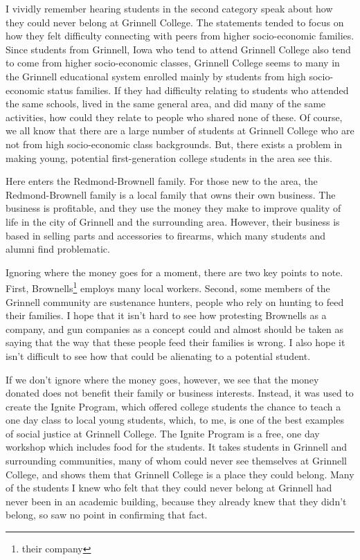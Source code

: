 \documentclass[12pt]{article}[titlepage]
\newcommand{\1}{\={a}}
\newcommand{\2}{\={e}}
\newcommand{\3}{\={\i}}
\newcommand{\4}{\=o}
\newcommand{\5}{\=u}
\newcommand{\6}{\={A}}
\renewcommand{\,}{\textsuperscript{,}}
\begin{document}
I vividly remember hearing students in the second category speak about how they could never belong at Grinnell College.
The statements tended to focus on how they felt difficulty connecting with peers from higher socio-economic families.
Since students from Grinnell, Iowa who tend to attend Grinnell College also tend to come from higher socio-economic classes, Grinnell College seems to many in the Grinnell educational system enrolled mainly by students from high socio-economic status families.
If they had difficulty relating to students who attended the same schools, lived in the same general area, and did many of the same activities, how could they relate to people who shared none of these.
Of course, we all know that there are a large number of students at Grinnell College who are not from high socio-economic class backgrounds.
But, there exists a problem in making young, potential first-generation college students in the area see this.

Here enters the Redmond-Brownell family.
For those new to the area, the Redmond-Brownell family is a local family that owns their own business.
The business is profitable, and they use the money they make to improve quality of life in the city of Grinnell and the surrounding area.
However, their business is based in selling parts and accessories to firearms, which many students and alumni find problematic.

Ignoring where the money goes for a moment, there are two key points to note.
First, Brownells\footnote{their company} employs many local workers.
Second, some members of the Grinnell community are sustenance hunters, people who rely on hunting to feed their families.
I hope that it isn't hard to see how protesting Brownells as a company, and gun companies as a concept could and almost should be taken as saying that the way that these people feed their families is wrong.
I also hope it isn't difficult to see how that could be alienating to a potential student.

If we don't ignore where the money goes, however, we see that the money donated does not benefit their family or business interests.
Instead, it was used to create the Ignite Program, which offered college students the chance to teach a one day class to local young students, which, to me, is one of the best examples of social justice at Grinnell College.
The Ignite Program is a free, one day workshop which includes food for the students.
It takes students in Grinnell and surrounding communities, many of whom could never see themselves at Grinnell College, and shows them that Grinnell College is a place they could belong.
Many of the students I knew who felt that they could never belong at Grinnell had never been in an academic building, because they already knew that they didn't belong, so saw no point in confirming that fact.
\end{document}
